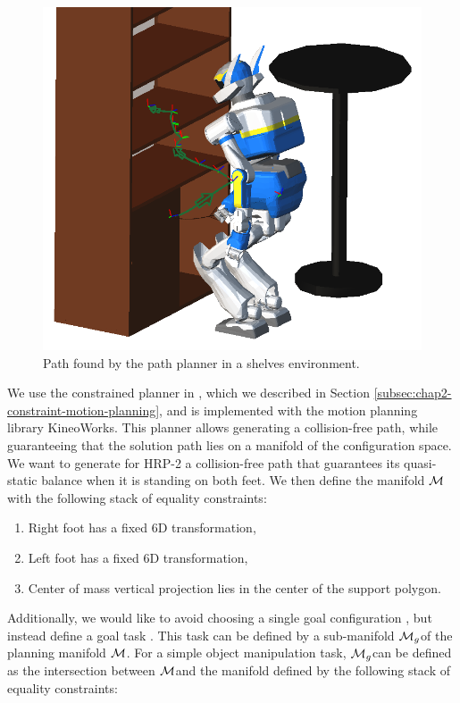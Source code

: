 \begin{figure}
\centering
\includegraphics[width=0.8\linewidth]
                {src/chap3-optimal-motion-planning/figure/shelves-path.png}
\caption{Path found by the path planner in a shelves environment.}
\label{path}
\end{figure}

We use the constrained planner in \cite{dalibard09}, which we
described in Section \ref{subsec:chap2-constraint-motion-planning},
and is implemented with the motion planning library
KineoWorks\texttrademark \cite{laumond2006kcs}. This planner allows
generating a collision-free path, while guaranteeing that the solution
path lies on a manifold of the configuration space. We want to
generate for HRP-2 a collision-free path that guarantees its
quasi-static balance when it is standing on both feet. We then define
the manifold $\mathcal{M}$ with the following stack of equality
constraints:

\begin{enumerate}
  \item Right foot has a fixed 6D transformation,
  \item Left foot has a fixed 6D transformation,
  \item Center of mass vertical projection lies in the center of the
    support polygon.
\end{enumerate}

Additionally, we would like to avoid choosing a single goal
configuration , but instead define a goal task
. This task can be defined by a sub-manifold
$\mathcal{M}_{g}$\thinspace of the planning manifold $\mathcal{M}$. For a
simple object manipulation task, $\mathcal{M}_{g}$\thinspace can be
defined as the intersection between $\mathcal{M}$\thinspace and the
manifold defined by the following stack of equality constraints:

